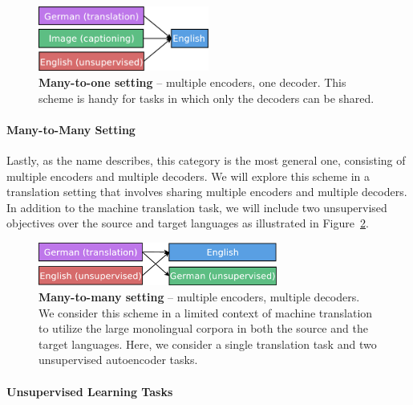 \begin{figure}[tbh]
\centering
\includegraphics[width=0.5\textwidth, clip=true, trim= 0 0 0
0]{img/6-1_mto}
\caption[Many-to-one setting]{{\bf Many-to-one setting} -- multiple encoders, one decoder. This scheme
is handy for tasks in which only the decoders can be shared.}
\label{f:mto}
\end{figure}

\paragraph{Many-to-Many Setting}
Lastly, as the name describes, this category is the most general one,
consisting of multiple encoders and multiple decoders.
We will explore this scheme in a translation setting that involves sharing multiple
encoders and multiple decoders.  In addition to the machine
translation task, we will include two unsupervised 
objectives over the source and target languages as illustrated in
Figure~\ref{f:mtm}.

\begin{figure}[tbh]
\centering
\includegraphics[width=0.7\textwidth, clip=true, trim= 0 0 0
0]{img/6-1_mtm}
\caption[Many-to-many setting]{{\bf Many-to-many setting} -- multiple encoders, multiple decoders. We
consider this scheme in a limited context of machine translation to utilize the large
monolingual corpora in both the source and the target languages. Here, we
consider a single translation task and two unsupervised autoencoder tasks.} 
\label{f:mtm}
\end{figure}

\paragraph{Unsupervised Learning Tasks}

